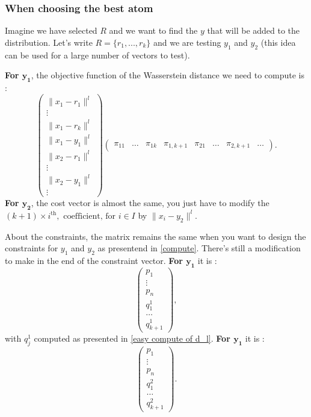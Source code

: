 \documentclass{amsart}
\begin{document}
\subsubsection{When choosing the best atom}
Imagine we have selected $R$ and we want to find the $y$ that will be added to the distribution. Let's write $R=\{r_1,...,r_k\}$ and we are testing $y_1$ and $y_2$ (this idea can be used for a large number of vectors to test).
\newline 

\textbf{For $\mathbf{y_1}$}, the objective function of the Wasserstein distance we need to compute is : 
$$
\begin{pmatrix}
    \lVert x_1-r_1 \rVert^l \\ \vdots \\ \lVert x_1-r_k \rVert^l \\ \lVert x_1-y_1 \rVert^l\\  \lVert x_2-r_1 \rVert^l \\ \vdots  \\  \lVert x_2-y_1 \rVert^l \\ \vdots
\end{pmatrix}
\begin{pmatrix}
    \pi_{11} & \hdots & \pi_{1k} & \pi_{1,k+1} & \pi_{21} &\hdots &\pi_{2,k+1} & \hdots
\end{pmatrix}.
$$
\textbf{For $\mathbf{y_2}$}, the cost vector is almost the same, you just have to modify the $\left(k+1\right)\times i^{\text{th}}, \text{ coefficient, for } i\in I$ by $\lVert x_i-y_2\rVert^l$.
\newline 

About the constraints, the matrix remains the same when you want to design the constraints for $y_1$ and $y_2$ as presentend in \ref{compute}. There's still a modification to make in the end of the constraint vector. \textbf{For $\mathbf{y_1}$} it is :
$$
\begin{pmatrix}
    p_1 \\ \vdots \\p_n \\ q^1_1 \\ \hdots \\ q^1_{k+1}
\end{pmatrix},
$$
with $q^1_j$ computed as presented in \ref{easy compute of d_l}. \textbf{For $\mathbf{y_1}$} it is :
$$
\begin{pmatrix}
    p_1 \\ \vdots \\p_n \\ q^2_1 \\ \hdots \\ q^2_{k+1}
\end{pmatrix}.
$$
\end{document}
